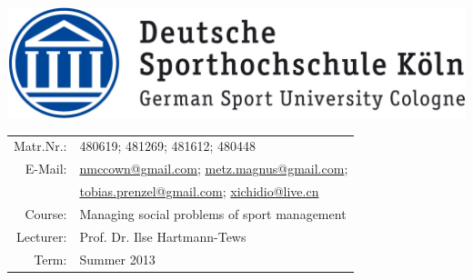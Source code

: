 \begin{titlepage}
\maketitle
     \vspace{2cm} %
\begin{center}
\includegraphics[scale=0.9]{logo_dshs_01.jpg}
\end{center}
\vspace{2cm} %
\begin{center}
\begin{tabular}{rl}
Matr.Nr.: &480619; 481269; 481612; 480448 \\ 
E-Mail: &\href{mailto:nmccown@gmail.com}{nmccown@gmail.com}; \href{mailto:metz.magnus@gmail.com}{metz.magnus@gmail.com};\\ &\href{mailto:tobias.prenzel@gmail.com}{tobias.prenzel@gmail.com};
 \href{mailto:xichidio@live.cn}{xichidio@live.cn} \\ 
Course: & Managing social problems of sport management \\
Lecturer: & Prof. Dr. Ilse Hartmann-Tews\\
Term: & Summer 2013
\end{tabular} 
\end{center}
\thispagestyle{empty} %
\end{titlepage}

